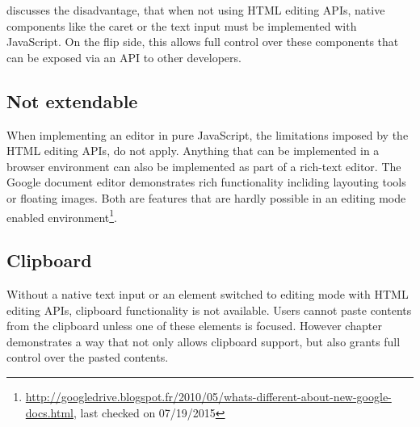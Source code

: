  discusses the disadvantage, that when not using HTML editing APIs, native components like the caret or the text input must be implemented with JavaScript. On the flip side, this allows full control over these components that can be exposed via an API to other developers.


\subsection{Not extendable} When implementing an editor in pure JavaScript, the limitations imposed by the HTML editing APIs, do not apply. Anything that can be implemented in a browser environment can also be implemented as part of a rich-text editor. The Google document editor demonstrates rich functionality incliding layouting tools or floating images. Both are features that are hardly possible in an editing mode enabled environment\footnote{\url{http://googledrive.blogspot.fr/2010/05/whats-different-about-new-google-docs.html}, last checked on 07/19/2015}. %

\subsection{Clipboard}

Without a native text input or an element switched to editing mode with HTML editing APIs, clipboard functionality is not available. Users cannot paste contents from the clipboard unless one of these elements is focused. However chapter  demonstrates a way that not only allows clipboard support, but also grants full control over the pasted contents.


